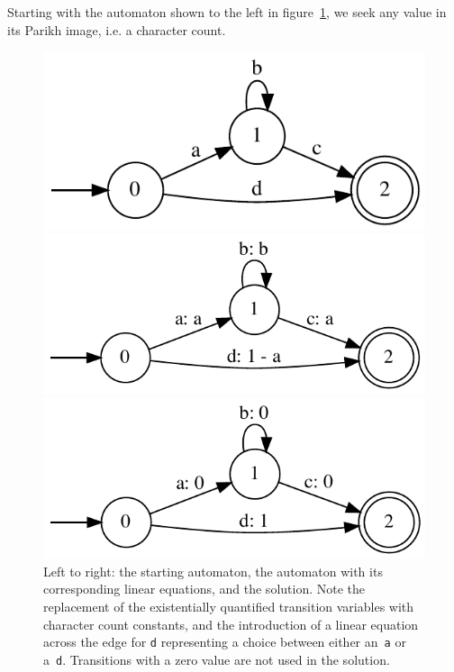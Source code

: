 \documentclass[runningheads]{llncs}
\begin{document}
Starting with the automaton shown to the left in figure~\ref{fig:automaton}, we seek
any value in its Parikh image, i.e. a character count.

\begin{figure}[h]
  \caption{Left to right: the starting automaton, the automaton with its corresponding linear equations, and the solution. Note the replacement of the existentially quantified transition variables with character count constants, and the introduction of a linear equation across the edge for \texttt{d} representing a choice between either an~\texttt{a} or a~\texttt{d}. Transitions with a zero value are not used in the solution.}\label{fig:automaton}
  \begin{minipage}[t]{0.3\textwidth}
    \includegraphics[width=\textwidth]{trace-0}
    \end{minipage}
    \begin{minipage}[t]{0.3\textwidth}
    \includegraphics[width=\textwidth]{trace-0-aut-0}
    \end{minipage}
    \begin{minipage}[t]{0.3\textwidth}
      \includegraphics[width=\textwidth]{trace-3-aut-0}
      \end{minipage}
  \end{figure}
\end{document}
